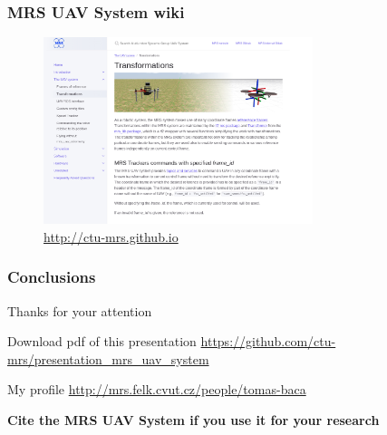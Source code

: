\documentclass[aspectratio=169]{beamer}
\begin{document}


  \begin{frame}
    \frametitle{MRS UAV System wiki}
    \begin{figure}
      \vspace{-1em}
      \caption*{\url{http://ctu-mrs.github.io}}
      \includegraphics[width=0.7\textwidth]{fig/wiki.png}
    \end{figure}

  \end{frame}






\begin{frame}
  \frametitle{Conclusions}

  \begin{center}
    \huge Thanks for your attention\\
  \end{center}

  \begin{block}{Download pdf of this presentation}
    \centering
    \Large\url{https://github.com/ctu-mrs/presentation_mrs_uav_system}
  \end{block}

  \begin{block}{My profile}
    \centering
    \Large\url{http://mrs.felk.cvut.cz/people/tomas-baca}
  \end{block}

  \begin{block}{\centering \textbf{Cite the MRS UAV System if you use it for your research}}
    \small {}
  \end{block}

\end{frame}
\end{document}

